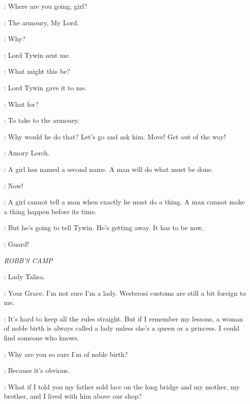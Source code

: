 \AMORY: Where are you going, girl? 

\ARYA: The armoury, My Lord. 

\AMORY: Why? 

\ARYA: Lord Tywin sent me. 


\AMORY: What might this be? 

\ARYA: Lord Tywin gave it to me. 

\AMORY: What for? 

\ARYA: To take to the armoury. 

\AMORY: Why would he do that? Let's go and ask him.  Move! Get out of the way! 


\ARYA: Amory Lorch. 

\JAQEN: A girl has named a second name. A man will do what must be done. 

\ARYA: Now! 

\JAQEN: A girl cannot tell a man when exactly he must do a thing. A man cannot make a thing happen before its time. 

\ARYA: But he's going to tell Tywin. He's getting away. It has to be now. 


\TYWIN: Guard! 


\scene

\textit{ROBB'S CAMP} 


\ROBB: Lady Talisa. 

\TALISA: Your Grace. I'm not sure I'm a lady. Westerosi customs are still a bit foreign to me. 

\ROBB: It's hard to keep all the rules straight. But if I remember my lessons, a woman of noble birth is always called a lady unless she's a queen or a princess. I could find someone who knows. 

\TALISA: Why are you so sure I'm of noble birth? 

\ROBB: Because it's obvious. 

\TALISA: What if I told you my father sold lace on the long bridge and my mother, my brother, and I lived with him above our shop? 

